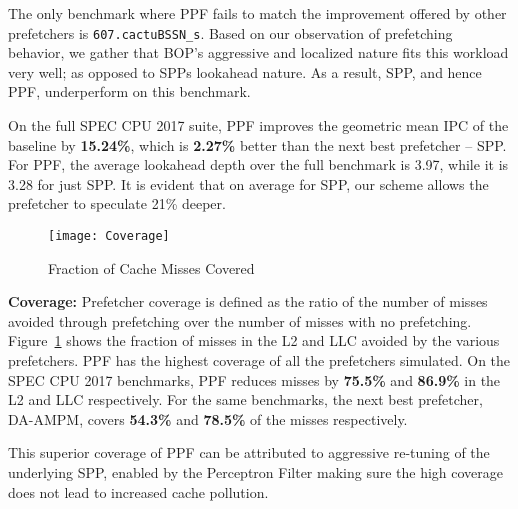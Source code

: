The only benchmark where PPF fails to match the improvement offered by
other prefetchers is {\tt 607.cactuBSSN\_s}.  Based on our observation
of prefetching behavior, we gather that BOP's aggressive and localized
nature fits this workload very well; as opposed to SPPs lookahead
nature.  As a result, SPP, and hence PPF, underperform on this
benchmark.


On the full SPEC CPU 2017 suite, PPF improves the geometric mean IPC
of the baseline by \textbf{15.24\%}, which is \textbf{2.27\%} better
than the next best prefetcher -- SPP. {\color{red}For PPF, the average 
lookahead depth over the full benchmark is 3.97, while it is 3.28 for just 
SPP. It is evident that on average for SPP, our scheme allows the 
prefetcher to speculate 21\% deeper.}

\begin{figure}[ht]
\texttt{[image: Coverage]}
\caption{Fraction of Cache Misses Covered}
\label{Fig:Coverage}
\end{figure}
%

\noindent \textbf{Coverage:} Prefetcher coverage is defined as the
ratio of the number of misses avoided through prefetching over the
number of misses with no prefetching.  Figure~\ref{Fig:Coverage} shows
the fraction of misses in the L2 and LLC avoided by the various
prefetchers.  PPF has the highest coverage of all the prefetchers
simulated.  On the SPEC CPU 2017 benchmarks, PPF reduces misses by
\textbf{75.5\%} and \textbf{86.9\%} in the L2 and LLC
respectively. For the same benchmarks, the next best prefetcher,
DA-AMPM, covers \textbf{54.3\%} and \textbf{78.5\%} of the misses
respectively.

This superior coverage of PPF can be attributed to aggressive
re-tuning of the underlying SPP, enabled by the Perceptron Filter
making sure the high coverage does not lead to increased cache
pollution.

